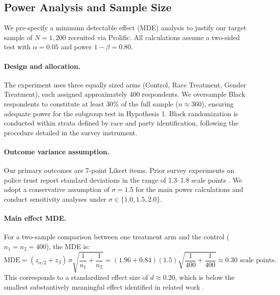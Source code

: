 
\subsection{Power Analysis and Sample Size}

We pre-specify a minimum detectable effect (MDE) analysis to justify our target sample of $N = 1{,}200$ recruited via Prolific.
All calculations assume a two-sided test with $\alpha = 0.05$ and power $1 - \beta = 0.80$.

\paragraph{Design and allocation.}
The experiment uses three equally sized arms (Control, Race Treatment, Gender Treatment), each assigned approximately 400 respondents.
We oversample Black respondents to constitute at least 30\% of the full sample ($n \approx 360$), ensuring adequate power for the subgroup test in Hypothesis 1.
Block randomization is conducted within strata defined by race and party identification, following the procedure detailed in the survey instrument.

\paragraph{Outcome variance assumption.}
Our primary outcomes are 7-point Likert items.
Prior survey experiments on police trust report standard deviations in the range of 1.3--1.8 scale points \citep{Stauffer2023, Peyton2022}.
We adopt a conservative assumption of $\sigma = 1.5$ for the main power calculations and conduct sensitivity analyses under $\sigma \in \{1.0, 1.5, 2.0\}$.

\paragraph{Main effect MDE.}
For a two-sample comparison between one treatment arm and the control ($n_1 = n_2 = 400$), the MDE is:
\begin{equation}
    \text{MDE} = (z_{\alpha/2} + z_{\beta})\,\sigma\sqrt{\frac{1}{n_1} + \frac{1}{n_2}}
               = (1.96 + 0.84)(1.5)\sqrt{\frac{1}{400} + \frac{1}{400}}
               \approx 0.30 \text{ scale points}.
\end{equation}
This corresponds to a standardized effect size of $d \approx 0.20$, which is below the smallest substantively meaningful effect identified in related work \citep{Stauffer2023}.

